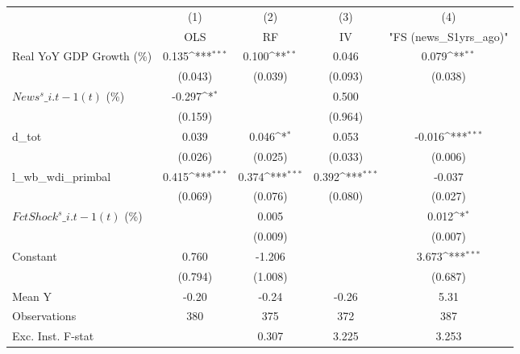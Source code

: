 {
\def\sym#1{\ifmmode^{#1}\else\(^{#1}\)\fi}
\begin{tabular}{l*{4}{c}}
\toprule
                    &\multicolumn{1}{c}{(1)}&\multicolumn{1}{c}{(2)}&\multicolumn{1}{c}{(3)}&\multicolumn{1}{c}{(4)}\\
                    &\multicolumn{1}{c}{OLS}&\multicolumn{1}{c}{RF}&\multicolumn{1}{c}{IV}&\multicolumn{1}{c}{ "FS (news\_S1yrs\_ago)" }\\
\midrule
Real YoY GDP Growth (\%)&       0.135\sym{***}&       0.100\sym{**} &       0.046         &       0.079\sym{**} \\
                    &     (0.043)         &     (0.039)         &     (0.093)         &     (0.038)         \\
\addlinespace
$ News^s\_{i.t-1}(t)$ (\%)&      -0.297\sym{*}  &                     &       0.500         &                     \\
                    &     (0.159)         &                     &     (0.964)         &                     \\
\addlinespace
d\_tot               &       0.039         &       0.046\sym{*}  &       0.053         &      -0.016\sym{***}\\
                    &     (0.026)         &     (0.025)         &     (0.033)         &     (0.006)         \\
\addlinespace
l\_wb\_wdi\_primbal    &       0.415\sym{***}&       0.374\sym{***}&       0.392\sym{***}&      -0.037         \\
                    &     (0.069)         &     (0.076)         &     (0.080)         &     (0.027)         \\
\addlinespace
$ FctShock^s\_{i.t-1}(t)$ (\%)&                     &       0.005         &                     &       0.012\sym{*}  \\
                    &                     &     (0.009)         &                     &     (0.007)         \\
\addlinespace
Constant            &       0.760         &      -1.206         &                     &       3.673\sym{***}\\
                    &     (0.794)         &     (1.008)         &                     &     (0.687)         \\
\midrule
Mean Y              &       -0.20         &       -0.24         &       -0.26         &        5.31         \\
Observations        &         380         &         375         &         372         &         387         \\
Exc. Inst. F-stat   &                     &       0.307         &       3.225         &       3.253         \\
\bottomrule
\end{tabular}
}

